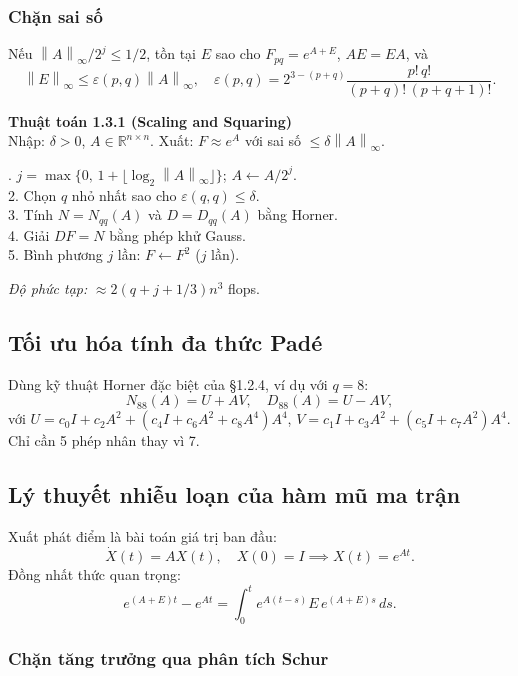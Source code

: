 \documentclass[12pt,a4paper]{report}
\newcommand{\R}{\mathbb{R}}
\newcommand{\norm}[1]{\left\lVert #1 \right\rVert}
\begin{document}
\subsubsection{Chặn sai số}

Nếu $\norm{A}_\infty / 2^j \le 1/2$, tồn tại $E$ sao cho $F_{pq} = e^{A+E}$, $AE=EA$, và
\[
  \norm{E}_\infty \le \varepsilon(p,q)\norm{A}_\infty,
  \quad
  \varepsilon(p,q) = 2^{3-(p+q)} \frac{p!\,q!}{(p+q)!\,(p+q+1)!}.
\]

\begin{algobox}
\textbf{Thuật toán 1.3.1 (Scaling and Squaring)} \\
Nhập: $\delta > 0$, $A \in \R^{n\times n}$. Xuất: $F \approx e^A$ với sai số $\le \delta \norm{A}_\infty$.

. $j = \max\{0,\, 1+\lfloor \log_2\norm{A}_\infty \rfloor\}$; \quad $A \leftarrow A/2^j$.\\
2. Chọn $q$ nhỏ nhất sao cho $\varepsilon(q,q) \le \delta$.\\
3. Tính $N = N_{qq}(A)$ và $D = D_{qq}(A)$ bằng Horner.\\
4. Giải $DF = N$ bằng phép khử Gauss.\\
5. Bình phương $j$ lần: $F \leftarrow F^2$ ($j$ lần).

\medskip
\textit{Độ phức tạp:} $\approx 2(q + j + 1/3)n^3$ flops.
\end{algobox}

\subsection{Tối ưu hóa tính đa thức Padé}

Dùng kỹ thuật Horner đặc biệt của §1.2.4, ví dụ với $q=8$:
\[
  N_{88}(A) = U + AV, \quad D_{88}(A) = U - AV,
\]
với $U = c_0 I + c_2 A^2 + (c_4 I + c_6 A^2 + c_8 A^4)A^4$,
$V = c_1 I + c_3 A^2 + (c_5 I + c_7 A^2)A^4$.
Chỉ cần 5 phép nhân thay vì 7.

\subsection{Lý thuyết nhiễu loạn của hàm mũ ma trận}

Xuất phát điểm là bài toán giá trị ban đầu:
\[
  \dot{X}(t) = AX(t), \quad X(0) = I \implies X(t) = e^{At}.
\]
Đồng nhất thức quan trọng:
\[
  e^{(A+E)t} - e^{At} = \int_0^t e^{A(t-s)} E\, e^{(A+E)s}\,ds.
\]

\subsubsection{Chặn tăng trưởng qua phân tích Schur}
\end{document}
